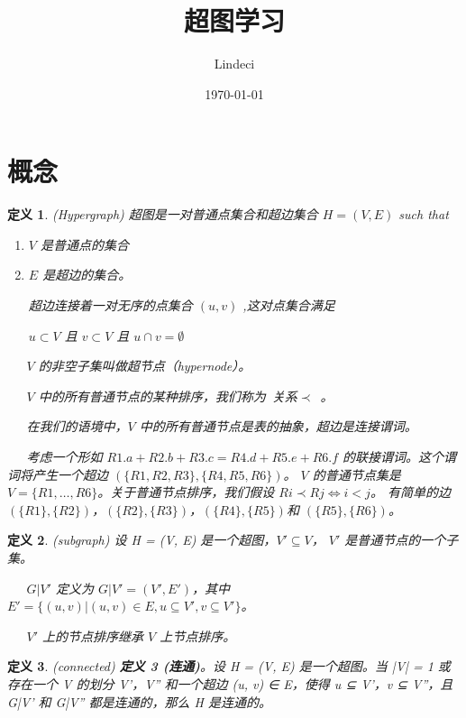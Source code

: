 \documentclass[fontset=none]{ctexart}
\title{超图学习}
\author{Lindeci}
\date{\today}
\begin{document}
\maketitle
\tableofcontents


\section{概念}

\newtheorem{definition}{定义}

\begin{definition}{(Hypergraph)}
    超图是一对普通点集合和超边集合 $H = (V,E)$ such that
    \begin{enumerate}
    \item $V$ 是普通点的集合
    \item $E$ 是超边的集合。
    
    超边连接着一对无序的点集合 $(u, v)$ ,这对点集合满足 
    
    $u \subset V$ 且 $v \subset V$ 且 $u \cap v = \emptyset$
    \end{enumerate}

    \ \ \ $V$ 的非空子集叫做超节点（hypernode）。

    \ \ \ $V$ 中的所有普通节点的某种排序，我们称为\ 关系$\prec$\ 。

    \ \ \ 在我们的语境中，$V$ 中的所有普通节点是表的抽象，超边是连接谓词。

    \ \ \ 考虑一个形如 $R1.a + R2.b + R3.c = R4.d + R5.e + R6.f$ 的联接谓词。这个谓词将产生一个超边 $(\{R1, R2, R3\}, \{R4, R5, R6\})$。
    $V$ 的普通节点集是 $V = \{R1, \ldots , R6\}$。关于普通节点排序，我们假设 $Ri \prec Rj \Leftrightarrow i < j$。
    有简单的边 $(\{R1\},\{R2\})$，$(\{R2\},\{R3\})$，$(\{R4\},\{R5\})$和 $(\{R5\}, \{R6\})$。
\end{definition}

\begin{definition}{(subgraph)}
    设 H = (V, E) 是一个超图，$V' \subseteq V$， $V'$ 是普通节点的一个子集。

    \ \ \ $G|V'$ 定义为 $G|V' = (V',E')$，其中 $E' = \{(u,v)|(u,v) \in E,u \subseteq V',v \subseteq V'\}$。
    
    \ \ \ $V'$ 上的节点排序继承 $V$ 上节点排序。
\end{definition}

\begin{definition}{(connected)}
\textbf{定义 3 (连通)}。设 H = (V, E) 是一个超图。当 |V| = 1 或存在一个 V 的划分 V'，V'' 和一个超边 (u, v) ∈ E，使得 u ⊆ V'，v ⊆ V''，且 G|V' 和 G|V'' 都是连通的，那么 H 是连通的。
\end{definition}
\end{document}
